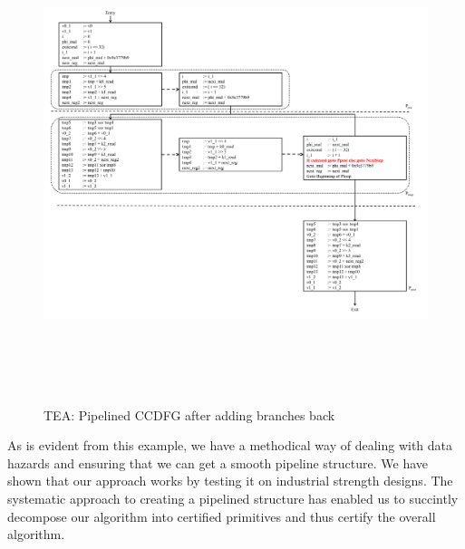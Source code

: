 \clearpage
\begin{figure}
\begin{center}
\includegraphics[height=5.5in]{fig-proposal/tea-after-adding-branches}
\end{center}
\caption{TEA: Pipelined CCDFG after adding branches back}
\label{fig:tea-after-adding-branches}
\end{figure}
\clearpage

As is evident from this example, we have a methodical way of dealing with data hazards and ensuring that we can get a smooth pipeline structure. 
We have shown that our approach works by testing it on industrial strength designs. The systematic approach to creating a pipelined structure has enabled 
us to succintly decompose our algorithm into certified primitives and thus certify the overall algorithm.





